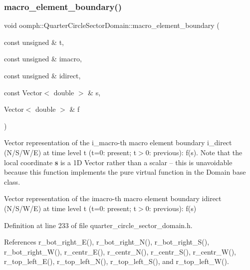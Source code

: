 \mbox{\label{classoomph_1_1QuarterCircleSectorDomain_a9faddf9d13e0a7633f732bac1ddda80b}} 
\subsubsection{\texorpdfstring{macro\+\_\+element\+\_\+boundary()}{macro\_element\_boundary()}}
{\footnotesize\ttfamily void oomph\+::\+Quarter\+Circle\+Sector\+Domain\+::macro\+\_\+element\+\_\+boundary (\begin{DoxyParamCaption}\item[{const unsigned \&}]{t,  }\item[{const unsigned \&}]{imacro,  }\item[{const unsigned \&}]{idirect,  }\item[{const Vector$<$ double $>$ \&}]{s,  }\item[{Vector$<$ double $>$ \&}]{f }\end{DoxyParamCaption})}



Vector representation of the i\+\_\+macro-\/th macro element boundary i\+\_\+direct (N/\+S/\+W/E) at time level t (t=0\+: present; t$>$0\+: previous)\+: f(s). Note that the local coordinate {\bfseries s} is a 1D Vector rather than a scalar -- this is unavoidable because this function implements the pure virtual function in the Domain base class. 

Vector representation of the imacro-\/th macro element boundary idirect (N/\+S/\+W/E) at time level t (t=0\+: present; t$>$0\+: previous)\+: f(s) 

Definition at line 233 of file quarter\+\_\+circle\+\_\+sector\+\_\+domain.\+h.



References r\+\_\+bot\+\_\+right\+\_\+\+E(), r\+\_\+bot\+\_\+right\+\_\+\+N(), r\+\_\+bot\+\_\+right\+\_\+\+S(), r\+\_\+bot\+\_\+right\+\_\+\+W(), r\+\_\+centr\+\_\+\+E(), r\+\_\+centr\+\_\+\+N(), r\+\_\+centr\+\_\+\+S(), r\+\_\+centr\+\_\+\+W(), r\+\_\+top\+\_\+left\+\_\+\+E(), r\+\_\+top\+\_\+left\+\_\+\+N(), r\+\_\+top\+\_\+left\+\_\+\+S(), and r\+\_\+top\+\_\+left\+\_\+\+W().



